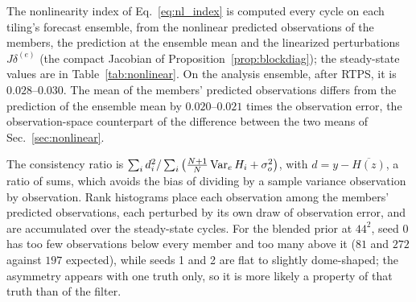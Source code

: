 The nonlinearity index of Eq.~\eqref{eq:nl_index} is
computed every cycle on each tiling's forecast ensemble, from the
nonlinear predicted observations of the members, the prediction at the
ensemble mean and the linearized perturbations $J\delta^{(e)}$ (the compact
Jacobian of Proposition~\ref{prop:blockdiag}); the steady-state values are in
Table~\ref{tab:nonlinear}. On the analysis ensemble, after RTPS, it is
$0.028$--$0.030$. The mean of the members' predicted observations differs
from the prediction of the ensemble mean by $0.020$--$0.021$ times the
observation error, the observation-space counterpart of the difference
between the two means of Sec.~\ref{sec:nonlinear}.

 The consistency ratio is
$\sum_i d_i^2/\sum_i\big(\tfrac{N+1}{N}\operatorname{Var}_e H_i+\sigma_o^2\big)$, with
$d=y-\overline{H(z)}$, a ratio of sums, which avoids the bias of dividing by
a sample variance observation by observation. Rank histograms
\citep{hamill2001} place each observation among the members' predicted
observations, each perturbed by its own draw of observation error, and are
accumulated over the steady-state cycles. For the blended prior at $44^2$,
seed 0 has too few observations below every member and too many above
it ($81$ and $272$ against $197$ expected), while seeds 1 and 2 are flat
to slightly dome-shaped; the asymmetry appears with one truth only, so it is
more likely a property of that truth than of the filter.

